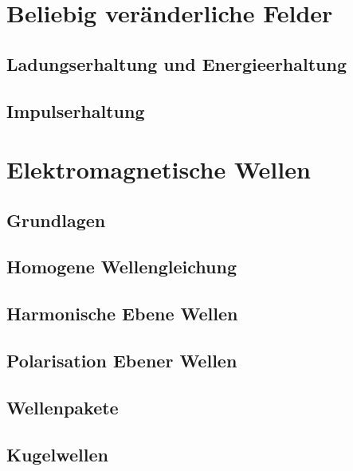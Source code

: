 
\usepackage{pdfpages}


\section{Beliebig veränderliche Felder}
\subsection{Ladungserhaltung und Energieerhaltung}

\subsection{Impulserhaltung}

\section{Elektromagnetische Wellen}
\subsection{Grundlagen}

\subsection{Homogene Wellengleichung}

\subsection{Harmonische Ebene Wellen}

\subsection{Polarisation Ebener Wellen}

\subsection{Wellenpakete}

\subsection{Kugelwellen}


